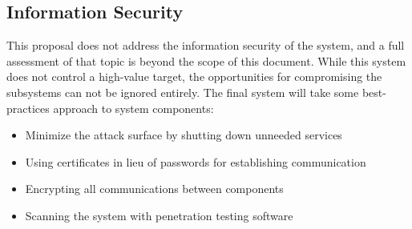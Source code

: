 \documentclass[12pt]{article}
\begin{document}
\subsection{Information Security}
This proposal does not address the information security of the system, and a full assessment of that topic is beyond the scope of this document. While this system does not control a high-value target, the opportunities for compromising the subsystems can not be ignored entirely. The final system will take some best-practices approach to system components:
\begin{itemize}
	\item{Minimize the attack surface by shutting down unneeded services}
	\item{Using certificates in lieu of passwords for establishing communication}
	\item{Encrypting all communications between components}
	\item{Scanning the system with penetration testing software}
\end{itemize}


 
\end{document}
